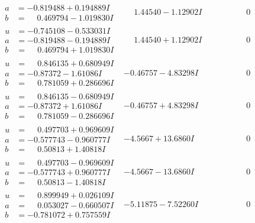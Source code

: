 \documentclass[1p]{elsarticle_modified}
\theoremstyle{definition}
\begin{document}
$$\begin{array}{c|c|c}
\begin{aligned}
a &= -0.819488 + 0.194889 I \\
b &= \phantom{-}0.469794 - 1.019830 I\end{aligned}
 & \phantom{-}1.44540 - 1.12902 I & \phantom{-0.000000 } 0 \\ \hline\begin{aligned}
u &= -0.745108 - 0.533031 I \\
a &= -0.819488 - 0.194889 I \\
b &= \phantom{-}0.469794 + 1.019830 I\end{aligned}
 & \phantom{-}1.44540 + 1.12902 I & \phantom{-0.000000 } 0 \\ \hline\begin{aligned}
u &= \phantom{-}0.846135 + 0.680949 I \\
a &= -0.87372 - 1.61086 I \\
b &= \phantom{-}0.781059 + 0.286696 I\end{aligned}
 & -0.46757 - 4.83298 I & \phantom{-0.000000 } 0 \\ \hline\begin{aligned}
u &= \phantom{-}0.846135 - 0.680949 I \\
a &= -0.87372 + 1.61086 I \\
b &= \phantom{-}0.781059 - 0.286696 I\end{aligned}
 & -0.46757 + 4.83298 I & \phantom{-0.000000 } 0 \\ \hline\begin{aligned}
u &= \phantom{-}0.497703 + 0.969609 I \\
a &= -0.577743 - 0.960777 I \\
b &= \phantom{-}0.50813 + 1.40818 I\end{aligned}
 & -4.5667 + 13.6860 I & \phantom{-0.000000 } 0 \\ \hline\begin{aligned}
u &= \phantom{-}0.497703 - 0.969609 I \\
a &= -0.577743 + 0.960777 I \\
b &= \phantom{-}0.50813 - 1.40818 I\end{aligned}
 & -4.5667 - 13.6860 I & \phantom{-0.000000 } 0 \\ \hline\begin{aligned}
u &= \phantom{-}0.899949 + 0.026109 I \\
a &= \phantom{-}0.053027 - 0.660507 I \\
b &= -0.781072 + 0.757559 I\end{aligned}
 & -5.11875 - 7.52260 I & \phantom{-0.000000 } 0 \\ \hline\begin{aligned}

\end{aligned}
\end{array}$$
\end{document}
